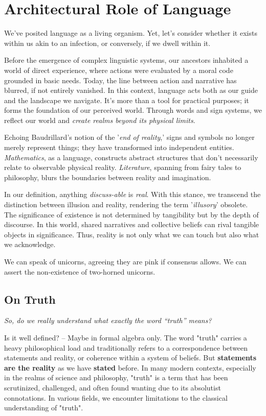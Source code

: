 \documentclass[11pt,a4]{article}
\begin{document}
\section{Architectural Role of Language}

We've posited language as a living organism. Yet, let's consider whether it exists within us akin to an infection, or conversely, if we dwell within it.
\par
Before the emergence of complex linguistic systems, our ancestors inhabited a world of direct experience, where actions were evaluated by a moral code grounded in basic needs. Today, the line between action and narrative has blurred, if not entirely vanished. In this context, language acts both as our guide and the landscape we navigate. It's more than a tool for practical purposes; it forms the foundation of our perceived world. Through words and sign systems, we reflect our world and \textit{create realms beyond its physical limits}.

\par
Echoing Baudrillard's notion of the '\textit{end of reality},' signs and symbols no longer merely represent things; they have transformed into independent entities.
\textit{Mathematics}, as a language, constructs abstract structures that don't necessarily relate to observable physical reality. \textit{Literature}, spanning from fairy tales to philosophy, blurs the boundaries between reality and imagination.

\par
In our definition, anything\textit{ discuss-able} is \textit{real}. With this stance, we transcend the distinction between illusion and reality, rendering the term '\textit{illusory}' obsolete. The significance of existence is not determined by tangibility but by the depth of discourse. In this world, shared narratives and collective beliefs can rival tangible objects in significance. Thus, reality is not only what we can touch but also what we acknowledge.
\par
We can speak of unicorns, agreeing they are pink if consensus allows. We can assert the non-existence of two-horned unicorns.

\subsection{On Truth}


\par
\textit{So, do we really understand what exactly the word “truth” means?} \\
\par
Is it well defined? -- Maybe in formal algebra only. The word "truth" carries a heavy philosophical load and traditionally refers to a correspondence between statements and reality, or coherence within a system of beliefs. But \textbf{statements are the reality} as we have \textbf{stated} before.
In many modern contexts, especially in the realms of science and philosophy, "truth" is a term that has been scrutinized, challenged, and often found wanting due to its absolutist connotations.
In various fields, we encounter limitations to the classical understanding of "truth".
\end{document}

